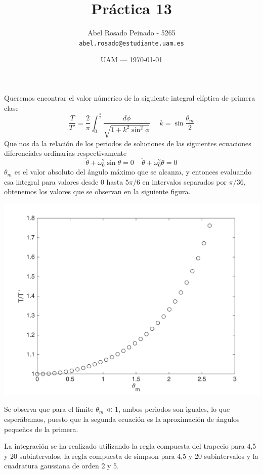\documentclass{article}
\title{Práctica 13} %
\author{Abel Rosado Peinado - 5265\\ \texttt{abel.rosado@estudiante.uam.es}} %
\date{UAM --- \today} %
\begin{document}
\maketitle %
\noindent Queremos encontrar el valor númerico de la siguiente integral elíptica de primera clase 
\[\frac{T}{T'} = \frac{2}{\pi}\int_0^{\frac{\pi}{2}}\frac{d\phi}{\sqrt{1+k^2\sin^2\phi}} \ \ \ \ \ \ k = \sin{\frac{\theta_m}{2}}\]
Que nos da la relación de los periodos de soluciones de las siguientes ecuaciones diferenciales ordinarias respectivamente
\[\ddot{\theta} + \omega_0^2 \sin\theta = 0 \ \ \ \ \ \ddot{\theta} + \omega_0^2 \theta = 0 \]
$\theta_m$ es el valor absoluto del ángulo máximo que se alcanza, y entonces evaluando esa integral para valores desde 0 hasta $5\pi /6$ en intervalos separados por $\pi/36$, obtenemos los valores que se observan en la siguiente figura.

\includegraphics{untitled.png}

Se observa que para el límite $\theta_m \ll 1$, ambos periodos son iguales, lo que esperábamos, puesto que la segunda ecuación es la aproximación de ángulos pequeños de la primera.

La integración se ha realizado utilizando la regla compuesta del trapecio para 4,5 y 20 subintervalos, la regla compuesta de simpson para 4,5 y 20 subintervalos y la cuadratura gaussiana de orden 2 y 5.
\end{document}
